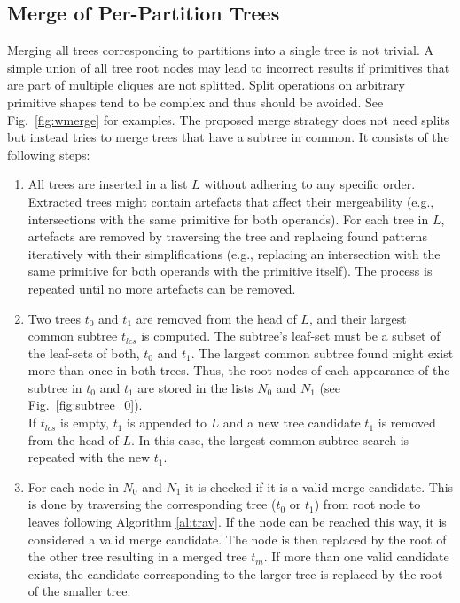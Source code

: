 \subsection{Merge of Per-Partition Trees}
\label{sec:merge}
Merging all trees corresponding to partitions into a single tree is not trivial. 
A simple union of all tree root nodes may lead to incorrect results if primitives that are part of multiple cliques are not splitted.
Split operations on arbitrary primitive shapes tend to be complex and thus should be avoided.
See Fig.~\ref{fig:wmerge} for examples.  
The proposed merge strategy does not need splits but instead tries to merge trees that have a subtree in common.
It consists of the following steps:
\begin{enumerate}
	\item All trees are inserted in a list $L$ without adhering to any specific order.   
	Extracted trees might contain artefacts that affect their mergeability (e.g., intersections with the same primitive for both operands). 
	For each tree in $L$, artefacts are removed by traversing the tree and replacing found patterns iteratively with their simplifications (e.g., replacing an intersection with the same primitive for both operands with the primitive itself). 
	The process is repeated until no more artefacts can be removed.  
	\item Two trees $t_0$ and $t_1$ are removed from the head of $L$, and their largest common subtree $t_{lcs}$ is computed.
	The subtree's leaf-set must be a subset of the leaf-sets of both, $t_0$ and $t_1$. 
	The largest common subtree found might exist more than once in both trees.
	Thus, the root nodes of each appearance of the subtree in $t_0$ and $t_1$ are stored in the lists $N_0$ and $N_1$ (see Fig.~\ref{fig:subtree_0}).
	\\	
	If $t_{lcs}$ is empty, $t_1$ is appended to $L$ and a new tree candidate $t_1$ is removed from the head of $L$. 
	In this case, the largest common subtree search is repeated with the new $t_1$.
	\item For each node in $N_0$ and $N_1$ it is checked if it is a valid merge candidate.
	This is done by traversing the corresponding tree ($t_0$ or $t_1$) from root node to leaves following Algorithm \ref{al:trav}.
	If the node can be reached this way, it is considered a valid merge candidate.
	The node is then replaced by the root of the other tree resulting in a merged tree $t_m$.
	If more than one valid candidate exists, the candidate corresponding to the larger tree is replaced by the root of the smaller tree.

\end{enumerate}
